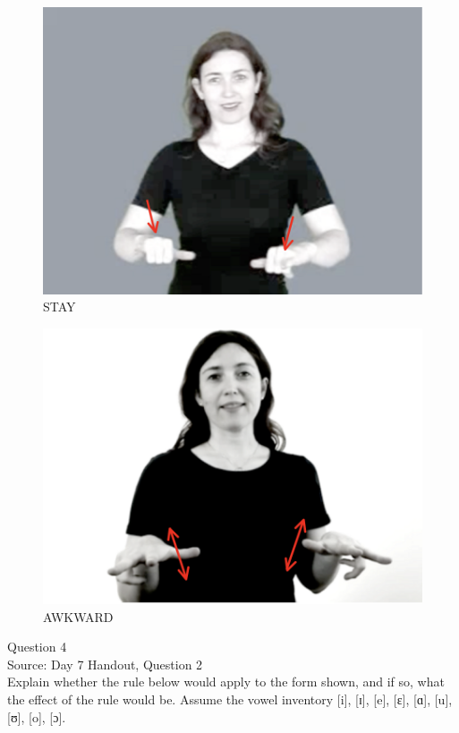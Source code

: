 \documentclass[12pt]{article}
\begin{document}
\begin{figure}[H]
\includegraphics{../images/asl_stay.png}
\caption{STAY}
\end{figure}
\begin{figure}[H]
\includegraphics{../images/asl_awkward.png}
\caption{AWKWARD}
\end{figure}

\newpage

{\large Question 4}\\

Source: Day 7 Handout, Question 2\\

Explain whether the rule below would apply to the form shown, and if so, what the effect of the rule would be. Assume the vowel inventory [i], [ɪ], [e], [ɛ], [ɑ], [u], [ʊ], [o], [ɔ].\\
\end{document}
